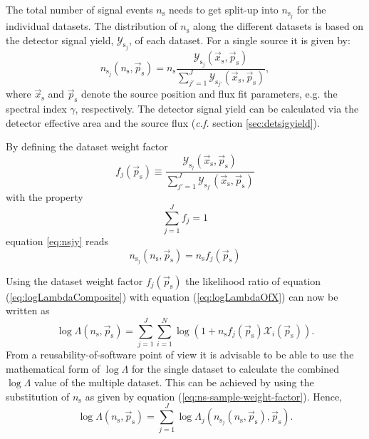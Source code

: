 \documentclass{article}
\newcommand{\eq}[1]{(\ref{#1})}
\newcommand{\ns}{n_{\mathrm{s}}}
\newcommand{\ps}{\vec{p}_{\mathrm{s}}}
\newcommand{\xs}{\vec{x}_{\mathrm{s}}}
\begin{document}
The total number of signal events $\ns$ needs to get split-up into
$n_{\mathrm{s}_j}$ for the individual datasets. The distribution of $\ns$
along the different datasets is based on the detector signal yield,
$\mathcal{Y}_{\mathrm{s}_j}$, of each dataset. For a single source it is given by:
\begin{equation}
 n_{\mathrm{s}_j}(\ns,\ps) = \ns \frac{\mathcal{Y}_{\mathrm{s}_j}(\xs,\ps)}{\sum_{j'=1}^{J} \mathcal{Y}_{\mathrm{s}_{j'}}(\xs,\ps)},
 \label{eq:nsjy}
\end{equation}
where $\xs$ and $\ps$ denote the source position and flux fit parameters, e.g.
the spectral index $\gamma$, respectively. The detector signal yield can be
calculated via the detector effective area and the source flux (\emph{c.f.} section
\ref{sec:detsigyield}).

By defining the dataset weight factor
\begin{equation}
 f_j(\ps) \equiv \frac{\mathcal{Y}_{\mathrm{s}_j}(\xs,\ps)}{\sum_{j'=1}^{J} \mathcal{Y}_{\mathrm{s}_{j'}}(\xs,\ps)}
 \label{eq:dataset-weight-factor-single-source}
\end{equation}
with the property
\begin{equation}
 \sum_{j=1}^{J} f_j = 1
\end{equation}
equation \ref{eq:nsjy} reads
\begin{equation}
 n_{\mathrm{s}_j}(\ns,\ps) = \ns f_{j}(\ps)
 \label{eq:ns-sample-weight-factor}
\end{equation}

Using the dataset weight factor $f_{j}(\ps)$ the likelihood ratio of
equation \eq{eq:logLambdaComposite} with equation \eq{eq:logLambdaOfX} can now
be written as
\begin{equation}
 \log \Lambda(\ns,\ps) = \sum_{j=1}^{J} \sum_{i=1}^{N} \log (1 + \ns f_{j}(\ps)\mathcal{X}_i(\ps)).
\end{equation}
From a reusability-of-software point of view it is advisable to be able to use
the mathematical form of $\log \Lambda$ for the single dataset to calculate the
combined $\log \Lambda$ value of the multiple dataset. This can be achieved by
using the substitution of $\ns$ as given by equation (\ref{eq:ns-sample-weight-factor}).
Hence,
\begin{equation}
 \log \Lambda(\ns,\ps) = \sum_{j=1}^{J} \log \Lambda_j(n_{\mathrm{s}_j}(\ns,\ps),\ps).
 \label{eq:logLambdaOfLogLambdaj}
\end{equation}
\end{document}
